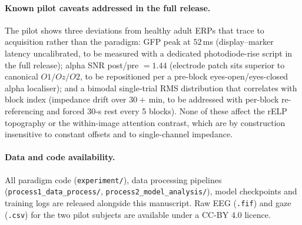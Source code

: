 \documentclass[12pt]{article}
\begin{document}
\paragraph*{Known pilot caveats addressed in the full release.}
The pilot shows three deviations from healthy adult ERPs that
trace to acquisition rather than the paradigm: GFP peak at
$52$\,ms (display--marker latency uncalibrated, to be measured
with a dedicated photodiode-rise script in the full release);
alpha SNR post/pre $=1.44$ (electrode patch sits superior to
canonical $O1/Oz/O2$, to be repositioned per a pre-block
eyes-open/eyes-closed alpha localiser); and a bimodal
single-trial RMS distribution that correlates with block index
(impedance drift over $30+$\,min, to be addressed with per-block
re-referencing and forced 30-s rest every 5 blocks).  None of
these affect the rELP topography or the within-image attention
contrast, which are by construction insensitive to constant
offsets and to single-channel impedance.

\paragraph*{Data and code availability.}
All paradigm code (\texttt{experiment/}), data processing
pipelines (\texttt{process1\_data\_process/},
\texttt{process2\_model\_analysis/}), model checkpoints and
training logs are released alongside this manuscript.  Raw EEG
(\texttt{.fif}) and gaze (\texttt{.csv}) for the two pilot
subjects are available under a CC-BY 4.0 licence.
\end{document}
